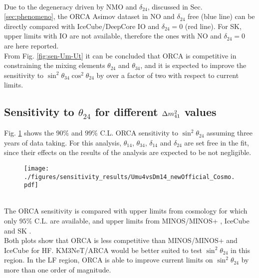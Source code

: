 \\
Due to the degeneracy driven by NMO and $\delta_{24}$, discussed in Sec. \ref{sec:phenomeno}, the ORCA Asimov dataset in NO and $\delta_{24}$ free (blue line) can be directly compared with IceCube/DeepCore IO and $\delta_{24}=0$ (red line). For SK, upper limits with IO are not available, therefore the ones with NO and $\delta_{24}=0$ are here reported.
\\
From Fig. \ref{fig:sen-Um-Ut} it can be concluded that ORCA is competitive in constraining the mixing elements $\theta_{24}$ and $\theta_{34}$, and it is expected to improve the sensitivity to $\sin^2 \theta_{34} \cos^2 \theta_{24}$ by over a factor of two with respect to current limits.

\subsection{Sensitivity to $\theta_{24}$ for different $\Delta m^2_{41}$ values}
Fig. \ref{fig:sen-Um} shows the $90\%$ and $99\%$ C.L. ORCA sensitivity to $\sin^2\theta_{24}$ assuming three years of data taking. For this analysis, $\theta_{14}$, $\theta_{34}$, $\delta_{14}$ and $\delta_{24}$ are set free in the fit, since their effects on the results of the analysis are expected to be not negligible. 
\begin{figure}[h]
	\centering
	\texttt{[image: ./figures/sensitivity\_results/Umu4vsDm14\_newOfficial\_Cosmo.pdf]}
	\label{fig:sen-Um}
\end{figure}
\\
The ORCA sensitivity is compared with upper limits from cosmology \cite{strongboundCosmology} for which only $95\%$ C.L. are available, and upper limits from MINOS/MINOS+ \cite{numu_disapp_minos}, IceCube \cite{IceCube_sterile} and SK \cite{SK}.
\\
Both plots show that ORCA is less competitive than MINOS/MINOS+ and IceCube for HF. KM3NeT/ARCA would be better suited to test $\sin^2\theta_{24}$ in this region. In the LF region, ORCA is able to improve current limits on $\sin^2\theta_{24}$ by more than one order of magnitude.


